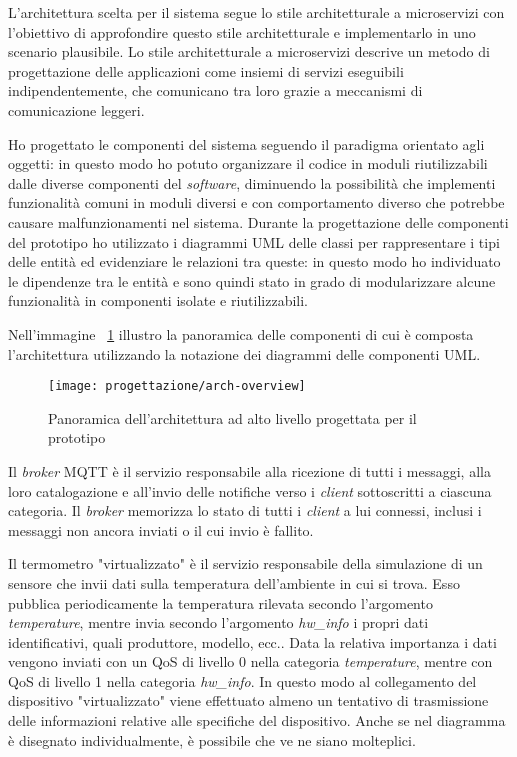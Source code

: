 
L'architettura scelta per il sistema segue lo stile architetturale a microservizi con l'obiettivo di approfondire questo stile architetturale e implementarlo in uno scenario plausibile.
Lo stile architetturale a microservizi descrive un metodo di progettazione delle applicazioni come insiemi di servizi eseguibili indipendentemente, che comunicano tra loro grazie a meccanismi di comunicazione leggeri.

Ho progettato le componenti del sistema seguendo il paradigma orientato agli oggetti: in questo modo ho potuto organizzare il codice in moduli riutilizzabili dalle diverse componenti del \emph{software}, diminuendo la possibilità che implementi funzionalità comuni in moduli diversi e con comportamento diverso che potrebbe causare malfunzionamenti nel sistema.
Durante la progettazione delle componenti del prototipo ho utilizzato i diagrammi UML delle classi per rappresentare i tipi delle entità ed evidenziare le relazioni tra queste: in questo modo ho individuato le dipendenze tra le entità e sono quindi stato in grado di modularizzare alcune funzionalità in componenti isolate e riutilizzabili.

Nell'immagine ~\ref{img:overview-arch} illustro la panoramica delle componenti di cui è composta l'architettura utilizzando la notazione dei diagrammi delle componenti UML.

\begin{figure}[H]
    \centering
    \texttt{[image: progettazione/arch-overview]}
    \caption{Panoramica dell'architettura ad alto livello progettata per il prototipo}
    \label{img:overview-arch}
\end{figure}


Il \emph{broker} MQTT è il servizio responsabile alla ricezione di tutti i messaggi, alla loro catalogazione e all'invio delle notifiche verso i \emph{client} sottoscritti a ciascuna categoria.
Il \emph{broker} memorizza lo stato di tutti i \emph{client} a lui connessi, inclusi i messaggi non ancora inviati o il cui invio è fallito.


Il termometro "virtualizzato" è il servizio responsabile della simulazione di un sensore che invii dati sulla temperatura dell'ambiente in cui si trova.
Esso pubblica periodicamente la temperatura rilevata secondo l'argomento \emph{temperature}, mentre invia secondo l'argomento \emph{hw\_info} i propri dati identificativi, quali produttore, modello, ecc..
Data la relativa importanza i dati vengono inviati con un QoS di livello 0 nella categoria \emph{temperature}, mentre con QoS di livello 1 nella categoria \emph{hw\_info}.
In questo modo al collegamento del dispositivo "virtualizzato" viene effettuato almeno un tentativo di trasmissione delle informazioni relative alle specifiche del dispositivo.
Anche se nel diagramma è disegnato individualmente, è possibile che ve ne siano molteplici.

